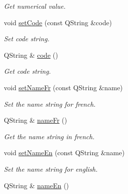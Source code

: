 \begin{DoxyCompactItemize}
\begin{DoxyCompactList}\small\item\em Get numerical value. \end{DoxyCompactList}\item 
void \hyperlink{classmdt_uic_number_item_a8c3a5faea122cdbaadf026b0a64ce59b}{setCode} (const QString \&code)
\begin{DoxyCompactList}\small\item\em Set code string. \end{DoxyCompactList}\item 
QString \& \hyperlink{classmdt_uic_number_item_a43652b0e8b1685b5d9890d175b42dc75}{code} ()
\begin{DoxyCompactList}\small\item\em Get code string. \end{DoxyCompactList}\item 
\hypertarget{classmdt_uic_number_item_a048e9a4070062e6d68dde4f264fdac05}{
void \hyperlink{classmdt_uic_number_item_a048e9a4070062e6d68dde4f264fdac05}{setNameFr} (const QString \&name)}
\label{classmdt_uic_number_item_a048e9a4070062e6d68dde4f264fdac05}

\begin{DoxyCompactList}\small\item\em Set the name string for french. \end{DoxyCompactList}\item 
\hypertarget{classmdt_uic_number_item_a088b41783b5f1bee0e49be43b993269c}{
QString \& \hyperlink{classmdt_uic_number_item_a088b41783b5f1bee0e49be43b993269c}{nameFr} ()}
\label{classmdt_uic_number_item_a088b41783b5f1bee0e49be43b993269c}

\begin{DoxyCompactList}\small\item\em Get the name string in french. \end{DoxyCompactList}\item 
\hypertarget{classmdt_uic_number_item_a63e2c89465b2053081ae89b2de9de1f3}{
void \hyperlink{classmdt_uic_number_item_a63e2c89465b2053081ae89b2de9de1f3}{setNameEn} (const QString \&name)}
\label{classmdt_uic_number_item_a63e2c89465b2053081ae89b2de9de1f3}

\begin{DoxyCompactList}\small\item\em Set the name string for english. \end{DoxyCompactList}\item 
\hypertarget{classmdt_uic_number_item_a5f87c87141076cf481173d7f75984ef1}{
QString \& \hyperlink{classmdt_uic_number_item_a5f87c87141076cf481173d7f75984ef1}{nameEn} ()}
\label{classmdt_uic_number_item_a5f87c87141076cf481173d7f75984ef1}


\end{DoxyCompactItemize}

